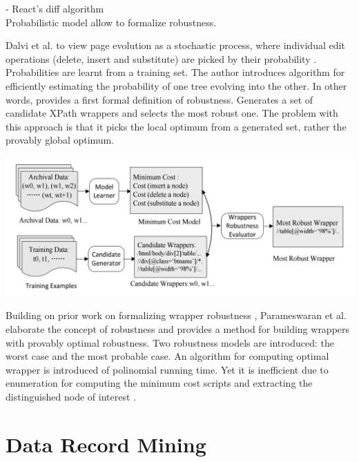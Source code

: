 - React’s diff algorithm\\

Probabilistic model allow to formalize robustness.

Dalvi et al. to view page evolution as a stochastic process, where individual edit operations (delete, insert and substitute) are picked by their probability \cite{dalvi2009a}. Probabilities are learnt from a training set. The author introduces algorithm for efficiently estimating the probability of one tree evolving into the other. In other words, provides a first formal definition of robustness. Generates a set of candidate XPath wrappers and selects the most robust one. The problem with this approach is that it picks the local optimum from a generated set, rather the provably global optimum.

\includegraphics[width=\linewidth]{figures/robust-web-extraction-framework}

Building on prior work on formalizing wrapper robustness \cite{dalvi2009a}, Parameswaran et al. \cite{DBLP:journals/pvldb/ParameswaranDGR11} elaborate the concept of robustness and provides a method for building wrappers with provably optimal robustness. Two robustness models are introduced: the worst case and the most probable case. An algorithm for computing optimal wrapper is introduced of polinomial running time. Yet it is inefficient due to enumeration for computing the minimum cost scripts and extracting the distinguished node of interest \cite{DBLP:conf/wism/LiuWYL12}.


\section{Data Record Mining}

